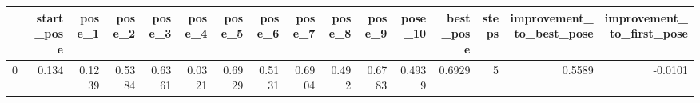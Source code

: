 \begin{tabular}{lrrrrrrrrrrrrrrr}
\toprule
{} &  start\_pose &  pose\_1 &  pose\_2 &  pose\_3 &  pose\_4 &  pose\_5 &  pose\_6 &  pose\_7 &  pose\_8 &  pose\_9 &  pose\_10 &  best\_pose &  steps &  improvement\_to\_best\_pose &  improvement\_to\_first\_pose \\
\midrule
0 &       0.134 &  0.1239 &  0.5384 &  0.6361 &  0.0321 &  0.6929 &  0.5131 &  0.6904 &   0.492 &  0.6783 &   0.4939 &     0.6929 &      5 &                    0.5589 &                    -0.0101 \\
\bottomrule
\end{tabular}
